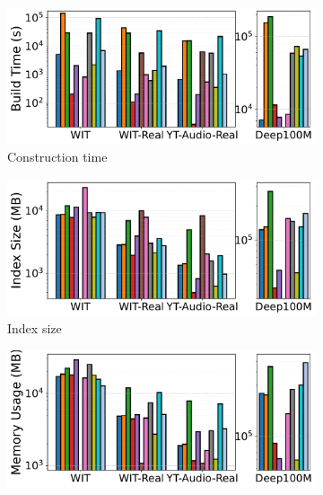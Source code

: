 \documentclass[sigconf, nonacm]{acmart}
\begin{document}
\begin{figure}[t]
		\begin{subfigure}[t]{0.495\columnwidth}
			\centering
			\captionsetup{font=small}
			\includegraphics[width=\linewidth]{figures/indexData/rangeFilter_build_time_comparison_query.pdf}
			\caption{\footnotesize Construction time}
			\label{fig:rangeFilter_build_time}
		\end{subfigure}
		\hfill
		\begin{subfigure}[t]{0.495\columnwidth}
			\centering
			\includegraphics[width=\linewidth]{figures/indexData/rangeFilter_index_size_mb_comparison_query.pdf}
			\caption{\footnotesize Index size}
			\label{fig:rangeFilter_index_size_mb}
		\end{subfigure}
		\hfill
		\begin{subfigure}[t]{0.495\columnwidth}
			\centering
			\includegraphics[width=\linewidth]{figures/indexData/rangeFilter_memory_mb_comparison_query.pdf}

\end{subfigure}
\end{figure}
\end{document}

